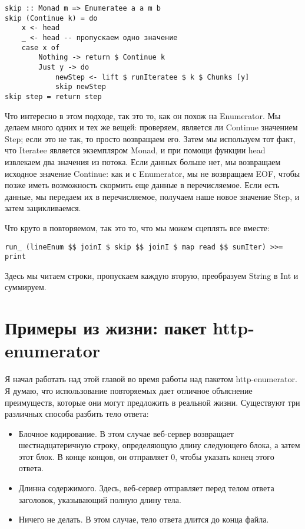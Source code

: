 \begin{lstlisting}
skip :: Monad m => Enumeratee a a m b
skip (Continue k) = do
    x <- head
    _ <- head -- пропускаем одно значение
    case x of
        Nothing -> return $ Continue k
        Just y -> do
            newStep <- lift $ runIteratee $ k $ Chunks [y]
            skip newStep
skip step = return step
\end{lstlisting}%

Что интересно в этом подходе, так это то, как он похож на Enumerator. Мы делаем много одних и тех же вещей: проверяем, является ли Continue значением Step; если это не так, то просто возвращаем его. Затем мы используем тот факт, что Iteratee является экземпляром Monad, и при помощи функции head извлекаем два значения из потока. Если данных больше нет, мы возвращаем исходное значение Continue: как и с Enumerator, мы не возвращаем EOF, чтобы позже иметь возможность скормить еще данные в перечисляемое. Если есть данные, мы передаем их в перечисляемое, получаем наше новое значение Step, и затем зацикливаемся.

Что круто в повторяемом, так это то, что мы можем сцеплять все вместе:

\begin{lstlisting}
run_ (lineEnum $$ joinI $ skip $$ joinI $ map read $$ sumIter) >>= print
\end{lstlisting}%

Здесь мы читаем строки, пропускаем каждую вторую, преобразуем String в Int и суммируем.

\section{Примеры из жизни: пакет http-enumerator}

Я начал работать над этой главой во время работы над пакетом http-enumerator. Я думаю, что использование повторяемых дает отличное объяснение преимуществ, которые они могут предложить в реальной жизни. Существуют три различных способа разбить тело ответа:

\begin{itemize}
\item Блочное кодирование. В этом случае веб-сервер возвращает шестнадцатеричную строку, определяющую длину следующего блока, а затем этот блок. В конце концов, он отправляет 0, чтобы указать конец этого ответа.
\item Длинна содержимого. Здесь, веб-сервер отправляет перед телом ответа заголовок, указывающий полную длину тела.
\item Ничего не делать. В этом случае, тело ответа длится до конца файла.
\end{itemize}

